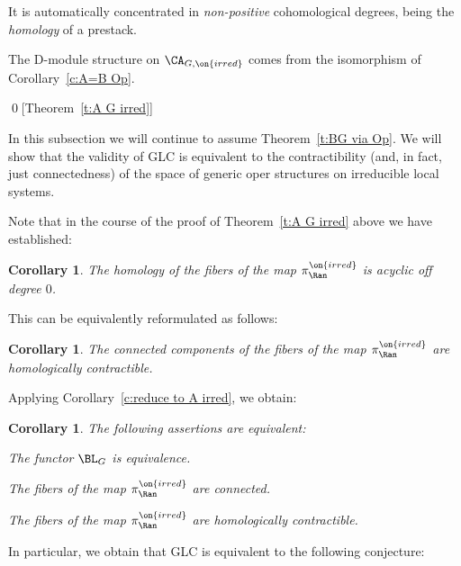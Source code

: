 \documentclass[9pt]{amsart}
\newtheorem{cor}[subsubsection]{Corollary}
\theoremstyle{remark}
\theoremstyle{definition}
\theoremstyle{remark}
\newcommand{\thmref}[1]{Theorem~\ref{#1}}
\newcommand{\corref}[1]{Corollary~\ref{#1}}
\numberwithin{equation}{section}
\begin{document}
It is automatically concentrated in \emph{non-positive} cohomological degrees, being the \emph{homology} of a prestack.

\sssec{}

The D-module structure on $\CA_{G,\on{irred}}$ comes from the isomorphism of \corref{c:A=B Op}. 

\qed[\thmref{t:A G irred}]



In this subsection we will continue to assume \thmref{t:BG via Op}. We will show that the
validity of GLC is equivalent to the contractibility (and, in fact, just connectedness) of the space
of generic oper structures on irreducible local systems. 

\sssec{}

Note that in the course of the proof of \thmref{t:A G irred} above we have established:

\begin{cor}
The homology of the fibers
of the map $\pi^{\on{irred}}_\Ran$ is acyclic off degree $0$.
\end{cor}

This can be equivalently reformulated as follows: 

\begin{cor}
The connected components of the fibers of the map $\pi^{\on{irred}}_\Ran$ are homologically contractible. 
\end{cor}

\sssec{}

Applying \corref{c:reduce to A irred}, we obtain:

\begin{cor} \label{c:conn of opers}
The following assertions are equivalent:

\smallskip

 The functor $\BL_G$ is equivalence.

\smallskip

 The fibers of the map $\pi^{\on{irred}}_\Ran$ are connected. 

\smallskip

 The fibers of the map $\pi^{\on{irred}}_\Ran$ are \emph{homologically contractible}. 

\end{cor} 

\sssec{}

In particular, we obtain that GLC is equivalent to the following conjecture:
\end{document}
